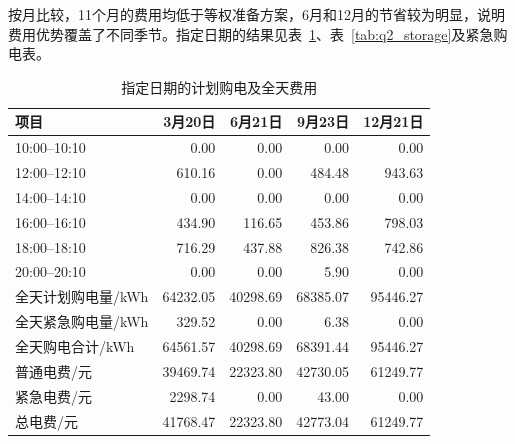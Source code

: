 按月比较，11个月的费用均低于等权准备方案，6月和12月的节省较为明显，说明费用优势覆盖了不同季节。指定日期的结果见表~\ref{tab:q2_specified_purchase}、表~\ref{tab:q2_storage}及紧急购电表。
\begin{table}[!htbp]
\centering
\caption{指定日期的计划购电及全天费用}
\label{tab:q2_specified_purchase}
\begin{tabular}{lrrrr}
\hline
项目 & 3月20日 & 6月21日 & 9月23日 & 12月21日 \\
\hline
10:00--10:10
& 0.00 & 0.00 & 0.00 & 0.00 \\
12:00--12:10
& 610.16 & 0.00 & 484.48 & 943.63 \\
14:00--14:10
& 0.00 & 0.00 & 0.00 & 0.00 \\
16:00--16:10
& 434.90 & 116.65 & 453.86 & 798.03 \\
18:00--18:10
& 716.29 & 437.88 & 826.38 & 742.86 \\
20:00--20:10
& 0.00 & 0.00 & 5.90 & 0.00 \\
全天计划购电量/kWh
& 64232.05 & 40298.69 & 68385.07 & 95446.27 \\
全天紧急购电量/kWh
& 329.52 & 0.00 & 6.38 & 0.00 \\
全天购电合计/kWh
& 64561.57 & 40298.69 & 68391.44 & 95446.27 \\
普通电费/元
& 39469.74 & 22323.80 & 42730.05 & 61249.77 \\
紧急电费/元
& 2298.74 & 0.00 & 43.00 & 0.00 \\
总电费/元
& 41768.47 & 22323.80 & 42773.04 & 61249.77 \\
\hline
\end{tabular}
\end{table}

